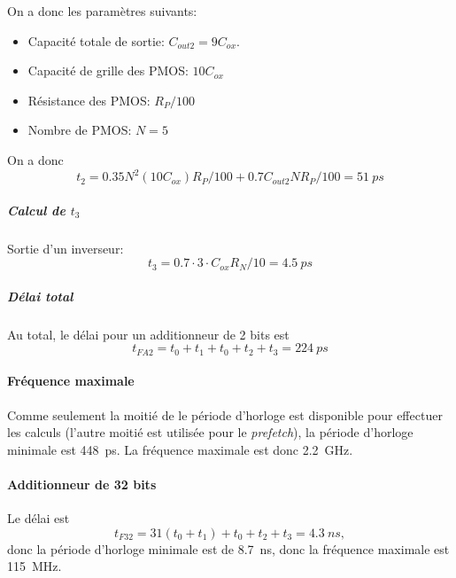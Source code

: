 \documentclass[frenchb,DIV=14]{scrartcl}
\begin{document}
On a donc les paramètres suivants:
\begin{itemize}
    \item Capacité totale de sortie: $C_{out2} = 9 C_{ox}$.
    \item Capacité de grille des PMOS: $10 C_{ox}$
    \item Résistance des PMOS: $R_P/100$
    \item Nombre de PMOS: $N = 5$
\end{itemize}
On a donc
\[t_2 = 0.35 N^2 (10C_{ox}) R_P/100 + 0.7 C_{out2} N R_P/100 = \SI{51}{ps}\]

\subparagraph{Calcul de $t_3$}
Sortie d'un inverseur:
\[t_3 = 0.7 \cdot 3 \cdot C_{ox} R_N/10 = \SI{4.5}{ps}\]

\subparagraph{Délai total}
Au total, le délai pour un additionneur de 2 bits est
\[t_{FA2} = t_0 + t_1 + t_0 + t_2 + t_3 = \SI{224}{ps}\]

\paragraph{Fréquence maximale}
Comme seulement la moitié de le période d'horloge est disponible pour
effectuer les calculs (l'autre moitié est utilisée pour le \emph{prefetch}),
la période d'horloge minimale est \SI{448}{ps}. La fréquence maximale est
donc \SI{2.2}{GHz}.

\paragraph{Additionneur de 32 bits}
Le délai est
\[t_{F32} = 31 (t_0 + t_1) + t_0 + t_2 + t_3 = \SI{4.3}{ns},\]
donc la période d'horloge minimale est de \SI{8.7}{ns}, donc la
fréquence maximale est \SI{115}{MHz}.
\end{document}
